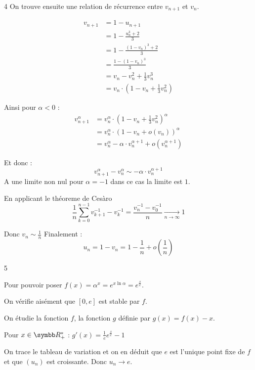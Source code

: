 \begin{correction}{4}
    On trouve ensuite une relation de récurrence entre $v_{n+1}$ et $v_{n}$. 

    \begin{align*}
        v_{n+1} &= 1-u_{n+1}\\
        &= 1-\frac{u_n^3+2}{3}\\
        &=1-\frac{(1-v_n)^3+2}{3}\\
        &=\frac{1-(1-v_n)^3}{3}\\
        &= v_n - v_n^2 + \frac{1}{3} v_n^3\\
        &= v_n \cdot \left(1 - v_n +\frac{1}{3}v_n^2\right)
    \end{align*}

    Ainsi pour $\alpha < 0$ :
    \begin{align*}
        v_{n+1}^\alpha &= v_n^\alpha\cdot\left(1-v_n+\frac{1}{3}v_n^2\right)^\alpha\\
        &= v_n^\alpha\cdot\left(1-v_n+o(v_n)\right)^\alpha\\
        &= v_n^\alpha - \alpha \cdot v_n^{\alpha+1} +o\left(v_n^{\alpha+1}\right)
   \end{align*}

Et donc :
\[v_{n+1}^\alpha - v_n^\alpha \sim -\alpha\cdot v_n^{\alpha+1}\]
A une limite non nul pour $\alpha = -1$ dans ce cas la limite est $1$.

En applicant le théoreme de Cesàro \[\frac{1}{n}\sum_{k=0}^{n-1}v_{k+1}^{-1} - v_k^{-1} = \frac{v_n^{-1}-v_0^{-1}}{n} \xrightarrow[n\to\infty]{} 1\]

Donc $ v_n \sim \frac{1}{n}$
Finalement :
\[u_n = 1-v_n = 1 -\frac{1}{n}+o\left(\frac{1}{n}\right)\]
\end{correction}

\newpage
\begin{correction}{5}

Pour pouvoir poser $f(x)=\alpha^{x}=e^{x \ln \alpha}=e^{\frac{x}{e}}$.

On vérifie aisément que $[0,e]$ est stable par $f$.

On étudie la fonction $f$, la fonction $g$ définie par $g(x)=f(x)-x$.

Pour $x\in\R_+^*$ : $ g'(x) = \frac{1}{e}e^{\frac{x}{e}}-1$



On trace le tableau de variation et on en déduit que $e$ est l'unique point fixe de $f$ et que $(u_n)$ est croissante.
Donc $u_n \to e$.
\end{correction}


